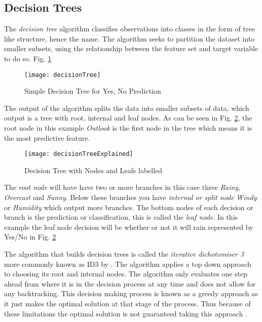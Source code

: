 \subsection{Decision Trees} \label{decTrees}
The \textit{decision tree} algorithm classifies observations into classes in the form of tree like structure, hence the name. The algorithm seeks to partition the dataset into smaller subsets, using the relationship between the feature set and target variable to do so. Fig. \ref{fig:decisionTree}

\begin{figure}[H]
	\texttt{[image: decisionTree]}
	\caption{Simple Decision Tree for Yes, No Prediction \\ \cite[Source:][]{quinlan_induction_1986}}
	\label{fig:decisionTree}
\end{figure}

The output of the algorithm splits the data into smaller subsets of data, which output is a tree with root, internal and leaf nodes. As can be seen in Fig. \ref{fig:decisionTreeExplained}, the root node in this example \textit{Outlook} is the first node in the tree which means it is the most predictive feature. 

\begin{figure}[H]
	\texttt{[image: decisionTreeExplained]}
	\caption{Decision Tree with Nodes and Leafs labelled}
	\label{fig:decisionTreeExplained}
\end{figure}

The \textit{root node} will have have two or more branches in this case three \textit{Rainy, Overcast} and \textit{Sunny}. Below these branches you have \textit{internal or split node} \textit{Windy} or \textit{Humidity} which output more branches. The bottom nodes of each decision or branch is the prediction or classification, this is called the \textit{leaf node}. In this example the leaf node decision will be whether or not it will rain represented by Yes/No in Fig. \ref{fig:decisionTreeExplained}

The algorithm that builds decision trees is called the \textit{iterative dichotomiser 3} more commonly known as ID3 by \cite{quinlan_induction_1986}. The algorithm applies a top down approach to choosing its root and internal nodes. The algorithm only evaluates one step ahead from where it is in the decision process at any time and does not allow for any backtracking. This decision making process is known as a greedy approach as it just makes the optimal solution at that stage of the process. Thus because of these limitations the optimal solution is not guaranteed taking this approach \citep{friedman_lazy_1996}.

